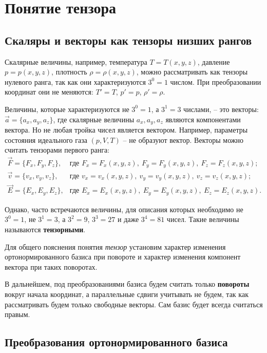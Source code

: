 \section{Понятие тензора}
\subsection{Скаляры и векторы как тензоры низших рангов}

	Скалярные величины, например, температура \( T = T(x, y, z) \), давление \( p = p(x, y, z) \), плотность \( \rho = \rho(x, y, z) \), можно рассматривать как тензоры нулевого ранга, так как они характеризуются \( 3^0 = 1 \) числом. При преобразовании координат они не меняются: \( T' = T \), \( p' = p \), \( \rho'=\rho\).
	
	Величины, которые характеризуются не \( 3^0 = 1 \), а \( 3^1 = 3 \) числами, -- это векторы: \( \vec{a} = \{ a_x, a_y, a_z \} \), где скалярные величины \( a_x, a_y, a_z \) являются компонентами вектора.
	Но не любая тройка чисел является вектором. Например,  параметры состояния идеального газа \( (p, V, T) \) -- не образуют вектор.
	Векторы можно считать тензорами первого ранга:
	\[ \begin{array}{rl}
			\vec{F} = \{ F_x, F_y, F_z \},&\text{где } F_x = F_x (x, y, z), \  F_y = F_y (x, y, z), \  F_z = F_z (x, y, z); \\
			\vec{v} = \{ v_x, v_y, v_z \},&\text{где } v_x = v_x (x, y, z), \  v_y = v_y (x, y, z), \  v_z = v_z (x, y, z); \\
			\vec{E} = \{ E_x, E_y, E_z \},&\text{где } E_x = E_x (x, y, z), \  E_y = E_y (x, y, z), \  E_z = E_z (x, y, z).
	\end{array} \]
	
	Однако, часто встречаются величины, для описания которых необходимо не \( 3^0 = 1 \), не \( 3^1 = 3 \), а \( 3^2 = 9 \), \( 3^3 = 27 \) и даже \( 3^4 = 81 \) чисел. Такие величины называются \textbf{тензорными}.
	
	Для общего пояснения понятия \textit{тензор} установим характер изменения ортонормированного базиса при повороте и характер изменения компонент вектора при таких поворотах.
	
	В дальнейшем, под преобразованиями базиса будем считать только \textbf{повороты} вокруг начала координат, а параллельные сдвиги учитывать не будем, так как рассматривать будем только свободные векторы. Сам базис будет всегда считаться правым.
	
\subsection{Преобразования ортонормированного базиса}
	
